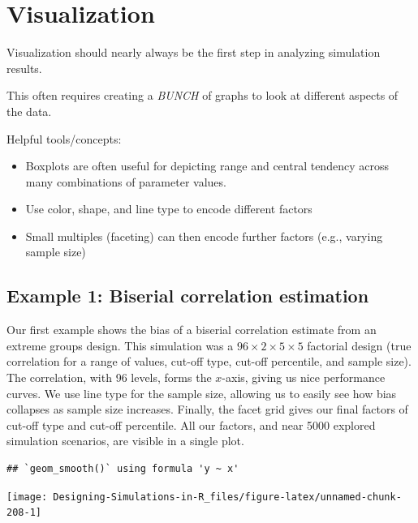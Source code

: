 \documentclass[
]{book}
\providecommand{\tightlist}{%
  \setlength{\itemsep}{0pt}\setlength{\parskip}{0pt}}
\begin{document}
\hypertarget{visualization}{%
\section{Visualization}\label{visualization}}

Visualization should nearly always be the first step in analyzing simulation results.

This often requires creating a \emph{BUNCH} of graphs to look at different aspects of the data.

Helpful tools/concepts:

\begin{itemize}
\tightlist
\item
  Boxplots are often useful for depicting range and central tendency across many combinations of parameter values.
\item
  Use color, shape, and line type to encode different factors
\item
  Small multiples (faceting) can then encode further factors (e.g., varying sample size)
\end{itemize}

\hypertarget{example-1-biserial-correlation-estimation}{%
\subsection{Example 1: Biserial correlation estimation}\label{example-1-biserial-correlation-estimation}}

Our first example shows the bias of a biserial correlation estimate from an extreme groups design.
This simulation was a \(96 \times 2 \times 5 \times 5\) factorial design (true correlation for a range of values, cut-off type, cut-off percentile, and sample size).
The correlation, with 96 levels, forms the \(x\)-axis, giving us nice performance curves.
We use line type for the sample size, allowing us to easily see how bias collapses as sample size increases.
Finally, the facet grid gives our final factors of cut-off type and cut-off percentile.
All our factors, and near 5000 explored simulation scenarios, are visible in a single plot.

\begin{verbatim}
## `geom_smooth()` using formula 'y ~ x'
\end{verbatim}

\begin{center}\texttt{[image: Designing-Simulations-in-R\_files/figure-latex/unnamed-chunk-208-1]} \end{center}
\end{document}

